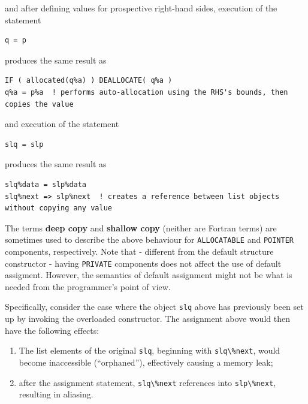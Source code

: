 \documentclass[
  paper=a4,
  ,captions=tableheading
]{scrartcl}
\newcommand{\passthrough}[1]{#1}
\providecommand{\tightlist}{%
  \setlength{\itemsep}{0pt}\setlength{\parskip}{0pt}}
\begin{document}
and after defining values for prospective right-hand sides, execution of
the statement

\begin{lstlisting}
q = p
\end{lstlisting}

produces the same result as

\begin{lstlisting}
IF ( allocated(q%a) ) DEALLOCATE( q%a )
q%a = p%a  ! performs auto-allocation using the RHS's bounds, then copies the value
\end{lstlisting}

and execution of the statement

\begin{lstlisting}
slq = slp
\end{lstlisting}

produces the same result as

\begin{lstlisting}
slq%data = slp%data
slq%next => slp%next  ! creates a reference between list objects without copying any value
\end{lstlisting}

The terms \textbf{deep copy} and \textbf{shallow copy} (neither are
Fortran terms) are sometimes used to describe the above behaviour for
\passthrough{\lstinline!ALLOCATABLE!} and
\passthrough{\lstinline!POINTER!} components, respectively. Note that -
different from the default structure constructor - having
\passthrough{\lstinline!PRIVATE!} components does not affect the use of
default assigment. However, the semantics of default assignment might
not be what is needed from the programmer's point of view.

Specifically, consider the case where the object
\passthrough{\lstinline!slq!} above has previously been set up by
invoking the overloaded constructor. The assignment above would then
have the following effects:

\begin{enumerate}
\def\labelenumi{\arabic{enumi}.}
\tightlist
\item
  The list elements of the original \passthrough{\lstinline!slq!},
  beginning with \passthrough{\lstinline!slq\%next!}, would become
  inaccessible (``orphaned''), effectively causing a memory leak;
\item
  after the assignment statement, \passthrough{\lstinline!slq\%next!}
  references into \passthrough{\lstinline!slp\%next!}, resulting in
  aliasing.
\end{enumerate}
\end{document}
